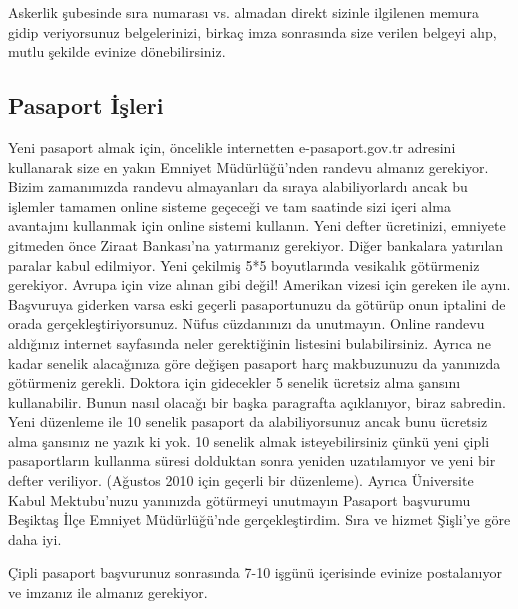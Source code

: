 \documentclass[12pt,a4paper]{article}
\begin{document}
Askerlik şubesinde sıra numarası vs. almadan direkt sizinle ilgilenen memura gidip veriyorsunuz belgelerinizi, birkaç imza sonrasında size verilen belgeyi alıp, mutlu şekilde evinize dönebilirsiniz. 

\subsection{Pasaport İşleri}
Yeni pasaport almak için, öncelikle internetten e-pasaport.gov.tr adresini kullanarak size en yakın Emniyet Müdürlüğü'nden randevu almanız gerekiyor. Bizim zamanımızda randevu almayanları da sıraya alabiliyorlardı ancak bu işlemler tamamen online sisteme geçeceği ve tam saatinde sizi içeri alma avantajını kullanmak için online sistemi kullanın. Yeni defter ücretinizi, emniyete gitmeden önce Ziraat Bankası'na yatırmanız gerekiyor. Diğer bankalara yatırılan paralar kabul edilmiyor. Yeni çekilmiş 5*5 boyutlarında vesikalık götürmeniz gerekiyor. Avrupa için vize alınan gibi değil! Amerikan vizesi için gereken ile aynı. Başvuruya giderken varsa eski geçerli pasaportunuzu da götürüp onun iptalini de orada gerçekleştiriyorsunuz. Nüfus cüzdanınızı da unutmayın. Online randevu aldığınız internet sayfasında neler gerektiğinin listesini bulabilirsiniz. Ayrıca ne kadar senelik alacağınıza göre değişen pasaport harç makbuzunuzu da yanınızda götürmeniz gerekli. Doktora için gidecekler 5 senelik ücretsiz alma şansını kullanabilir. Bunun nasıl olacağı bir başka paragrafta açıklanıyor, biraz sabredin. Yeni düzenleme ile 10 senelik pasaport da alabiliyorsunuz ancak bunu ücretsiz alma şansınız ne yazık ki yok. 10 senelik almak isteyebilirsiniz çünkü yeni çipli pasaportların kullanma süresi dolduktan sonra yeniden uzatılamıyor ve yeni bir defter veriliyor. (Ağustos 2010 için geçerli bir düzenleme). Ayrıca Üniversite Kabul Mektubu’nuzu yanınızda götürmeyi unutmayın Pasaport başvurumu Beşiktaş İlçe Emniyet Müdürlüğü’nde gerçekleştirdim. Sıra ve hizmet Şişli’ye göre daha iyi. 

Çipli pasaport başvurunuz sonrasında 7-10 işgünü içerisinde evinize postalanıyor ve imzanız ile almanız gerekiyor. 
\end{document}
